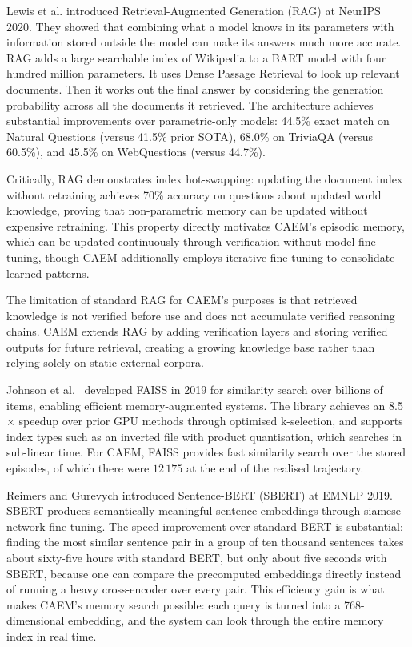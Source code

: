 Lewis et al. \cite{NEURIPS2020_6b493230} introduced Retrieval-Augmented Generation (RAG) at NeurIPS 2020. They showed that combining what a model knows in its parameters with information stored outside the model can make its answers much more accurate. RAG adds a large searchable index of Wikipedia to a BART model with four hundred million parameters. It uses Dense Passage Retrieval to look up relevant documents. Then it works out the final answer by considering the generation probability across all the documents it retrieved. The architecture achieves substantial improvements over parametric-only models: 44.5\% exact match on Natural Questions (versus 41.5\% prior SOTA), 68.0\% on TriviaQA (versus 60.5\%), and 45.5\% on WebQuestions (versus 44.7\%).

Critically, RAG demonstrates index hot-swapping: updating the document index without retraining achieves 70\% accuracy on questions about updated world knowledge, proving that non-parametric memory can be updated without expensive retraining. This property directly motivates CAEM's episodic memory, which can be updated continuously through verification without model fine-tuning, though CAEM additionally employs iterative fine-tuning to consolidate learned patterns.

The limitation of standard RAG for CAEM's purposes is that retrieved knowledge is not verified before use and does not accumulate verified reasoning chains. CAEM extends RAG by adding verification layers and storing verified outputs for future retrieval, creating a growing knowledge base rather than relying solely on static external corpora.

Johnson et al.\ \cite{8733051} developed FAISS in 2019 for similarity search over billions of items, enabling efficient memory-augmented systems. The library achieves an 8.5$\times$ speedup over prior GPU methods through optimised k-selection, and supports index types such as an inverted file with product quantisation, which searches in sub-linear time. For CAEM, FAISS provides fast similarity search over the stored episodes, of which there were $12\,175$ at the end of the realised trajectory.

Reimers and Gurevych \cite{reimers-gurevych-2019-sentence} introduced Sentence-BERT (SBERT) at EMNLP 2019. SBERT produces semantically meaningful sentence embeddings through siamese-network fine-tuning. The speed improvement over standard BERT is substantial: finding the most similar sentence pair in a group of ten thousand sentences takes about sixty-five hours with standard BERT, but only about five seconds with SBERT, because one can compare the precomputed embeddings directly instead of running a heavy cross-encoder over every pair. This efficiency gain is what makes CAEM's memory search possible: each query is turned into a 768-dimensional embedding, and the system can look through the entire memory index in real time.

